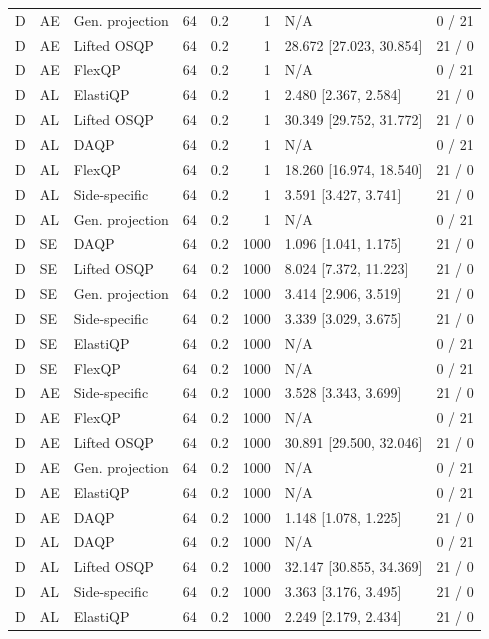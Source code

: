 \begin{longtable}{@{}lllrrrlr@{}}
D & AE & Gen. projection & 64 & 0.2 & 1 & N/A & 0 / 21 \\
D & AE & Lifted OSQP & 64 & 0.2 & 1 & 28.672 [27.023, 30.854] & 21 / 0 \\
D & AE & FlexQP & 64 & 0.2 & 1 & N/A & 0 / 21 \\
D & AL & ElastiQP & 64 & 0.2 & 1 & 2.480 [2.367, 2.584] & 21 / 0 \\
D & AL & Lifted OSQP & 64 & 0.2 & 1 & 30.349 [29.752, 31.772] & 21 / 0 \\
D & AL & DAQP & 64 & 0.2 & 1 & N/A & 0 / 21 \\
D & AL & FlexQP & 64 & 0.2 & 1 & 18.260 [16.974, 18.540] & 21 / 0 \\
D & AL & Side-specific & 64 & 0.2 & 1 & 3.591 [3.427, 3.741] & 21 / 0 \\
D & AL & Gen. projection & 64 & 0.2 & 1 & N/A & 0 / 21 \\
D & SE & DAQP & 64 & 0.2 & 1000 & 1.096 [1.041, 1.175] & 21 / 0 \\
D & SE & Lifted OSQP & 64 & 0.2 & 1000 & 8.024 [7.372, 11.223] & 21 / 0 \\
D & SE & Gen. projection & 64 & 0.2 & 1000 & 3.414 [2.906, 3.519] & 21 / 0 \\
D & SE & Side-specific & 64 & 0.2 & 1000 & 3.339 [3.029, 3.675] & 21 / 0 \\
D & SE & ElastiQP & 64 & 0.2 & 1000 & N/A & 0 / 21 \\
D & SE & FlexQP & 64 & 0.2 & 1000 & N/A & 0 / 21 \\
D & AE & Side-specific & 64 & 0.2 & 1000 & 3.528 [3.343, 3.699] & 21 / 0 \\
D & AE & FlexQP & 64 & 0.2 & 1000 & N/A & 0 / 21 \\
D & AE & Lifted OSQP & 64 & 0.2 & 1000 & 30.891 [29.500, 32.046] & 21 / 0 \\
D & AE & Gen. projection & 64 & 0.2 & 1000 & N/A & 0 / 21 \\
D & AE & ElastiQP & 64 & 0.2 & 1000 & N/A & 0 / 21 \\
D & AE & DAQP & 64 & 0.2 & 1000 & 1.148 [1.078, 1.225] & 21 / 0 \\
D & AL & DAQP & 64 & 0.2 & 1000 & N/A & 0 / 21 \\
D & AL & Lifted OSQP & 64 & 0.2 & 1000 & 32.147 [30.855, 34.369] & 21 / 0 \\
D & AL & Side-specific & 64 & 0.2 & 1000 & 3.363 [3.176, 3.495] & 21 / 0 \\
D & AL & ElastiQP & 64 & 0.2 & 1000 & 2.249 [2.179, 2.434] & 21 / 0 \\

\end{longtable}
